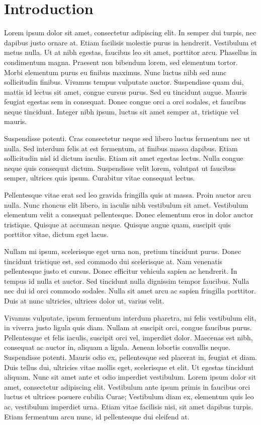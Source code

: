 \chapter{Introduction}
\label{chap:intro}

Lorem ipsum dolor sit amet, consectetur adipiscing elit. In semper dui turpis, nec dapibus justo ornare at. Etiam facilisis molestie purus in hendrerit. Vestibulum et metus nulla. Ut at nibh egestas, faucibus leo sit amet, porttitor arcu. Phasellus in condimentum magna. Praesent non bibendum lorem, sed elementum tortor. Morbi elementum purus eu finibus maximus. Nunc luctus nibh sed nunc sollicitudin finibus. Vivamus tempus vulputate auctor. Suspendisse quam dui, mattis id lectus sit amet, congue cursus purus. Sed eu tincidunt augue. Mauris feugiat egestas sem in consequat. Donec congue orci a orci sodales, et faucibus neque tincidunt. Integer nibh ipsum, luctus sit amet semper at, tristique vel mauris.

Suspendisse potenti. Cras consectetur neque sed libero luctus fermentum nec ut nulla. Sed interdum felis at est fermentum, at finibus massa dapibus. Etiam sollicitudin nisl id dictum iaculis. Etiam sit amet egestas lectus. Nulla congue neque quis consequat dictum. Suspendisse velit lorem, volutpat ut faucibus semper, ultrices quis ipsum. Curabitur vitae consequat lectus.

Pellentesque vitae erat sed leo gravida fringilla quis at massa. Proin auctor arcu nulla. Nunc rhoncus elit libero, in iaculis nibh vestibulum sit amet. Vestibulum elementum velit a consequat pellentesque. Donec elementum eros in dolor auctor tristique. Quisque at accumsan neque. Quisque augue quam, suscipit quis porttitor vitae, dictum eget lacus.

Nullam mi ipsum, scelerisque eget urna non, pretium tincidunt purus. Donec tincidunt tristique est, sed commodo dui scelerisque at. Nam venenatis pellentesque justo et cursus. Donec efficitur vehicula sapien ac hendrerit. In tempus id nulla et auctor. Sed tincidunt nulla dignissim tempor faucibus. Nulla nec dui id orci commodo sodales. Nulla sit amet arcu ac sapien fringilla porttitor. Duis at nunc ultricies, ultrices dolor ut, varius velit.

Vivamus vulputate, ipsum fermentum interdum pharetra, mi felis vestibulum elit, in viverra justo ligula quis diam. Nullam at suscipit orci, congue faucibus purus. Pellentesque et felis iaculis, suscipit orci vel, imperdiet dolor. Maecenas est nibh, consequat ac auctor in, aliquam a ligula. Aenean lobortis convallis neque. Suspendisse potenti. Mauris odio ex, pellentesque sed placerat in, feugiat et diam. Duis tellus dui, ultricies vitae mollis eget, scelerisque et elit. Ut egestas tincidunt aliquam. Nunc sit amet ante et odio imperdiet vestibulum. Lorem ipsum dolor sit amet, consectetur adipiscing elit. Vestibulum ante ipsum primis in faucibus orci luctus et ultrices posuere cubilia Curae; Vestibulum diam ex, elementum quis leo ac, vestibulum imperdiet urna. Etiam vitae facilisis nisi, sit amet dapibus turpis. Etiam fermentum arcu nunc, id pellentesque dui eleifend at.